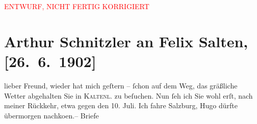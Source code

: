 
\begin{center}
            \textcolor{red}{ENTWURF, NICHT FERTIG KORRIGIERT}
                      \end{center}
            
         
         \renewcommand{\erwaehntePersonen}{Personen: Hugo von Hofmannsthal, Felix Salten}
         \renewcommand{\erwaehnteOrte}{Orte: Kaltenleutgeben, Salzburg, Wien}
         \renewcommand{\erwaehnteWerke}{Werke: Der Schleier der Beatrice. Schauspiel in fünf Akten, »Der Schleier der Beatrice«. Ein Konflikt mit dem Burgtheater}
               \section[Arthur Schnitzler an Felix Salten, {[}26. 6. 1902{]}]{ Arthur Schnitzler an Felix Salten, {[}26. 6. 1902{]}}\nopagebreak{}\rehead{ }\begin{ledgroupsized}[t]{13cm}\normalsize\beginnumbering \toendnotes[C]{\smallbreak\pagebreak[2]} 
\toendnotes[C]{\smallbreak}\pstart
           \noindent{}{\pb}lieber Freund, wieder hat mich geſtern – ſchon auf dem Weg, das
               gräßliche Wetter abgehalten Sie in \textsc{Kaltenl.} zu beſuchen. Nun ſeh ich Sie wohl erſt, nach meiner Rückkehr, etwa gegen den
                  10. Juli. Ich fahre {\pb}\label{K_L02976-1v}\label{K_L02976-1h}{ }Salzburg, Hugo dürfte übermorgen nachko{\geminationm}en.– Briefe

\end{ledgroupsized}
